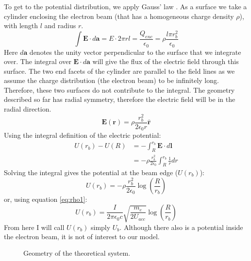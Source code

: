 To get to the potential distribution, we apply Gauss' law \cite{GriffithsEM}. As a surface we take a cylinder enclosing the electron beam (that has a homogeneous charge density $\rho$), with length $l$ and radius $r$.
\begin{equation}
\int\textbf{E}\cdot d\mathbf{a} = E\cdot2\pi r l = \frac{Q_{enc}}{\epsilon_0} = \rho \frac{l\pi r_b^2}{\epsilon_0}
\end{equation}
Here $d\mathbf{a}$ denotes the unity vector perpendicular to the surface that we integrate over. The integral over $\textbf{E}\cdot d\mathbf{a}$ will give the flux of the electric field through this surface.
The two end facets of the cylinder are parallel to the field lines as we assume the charge distribution (the electron beam) to be infinitely long. Therefore, these two surfaces do not contribute to the integral.
The geometry described so far has radial symmetry, therefore the electric field will be in the radial direction.
\begin{equation}
\mathbf{E}(\mathbf{r}) = \rho \frac{r_b^2}{2\epsilon_0r}\hat{\mathbf{r}}
\end{equation}
Using the integral definition of the electric potential:
\begin{align}
U(r_b)-U(R) &= -\int_R^{r_b} \mathbf{E}\cdot d\mathbf{l} \nonumber \\
&= - \rho \frac{r_b^2}{2\epsilon_0} \int_R^{r_b} \frac{1}{r} dr
\end{align}
Solving the integral gives the potential at the beam edge ($U(r_b)$):
\begin{equation}
\label{eq:vbeamrho}
U(r_b) = - \rho \frac{r_b^2}{2\epsilon_0} \log\left(\frac{R}{r_b}\right)
\end{equation}
or, using equation \ref{eq:rho1}:
\begin{equation}
\label{eq:vbeamI}
U(r_b)=\frac{I}{2\pi\epsilon_0 c}\sqrt{\frac{m_e}{2U_{acc}}}\log\left(\frac{R}{r_b}\right)
\end{equation}
From here I will call $U(r_b)$ simply $U_b$. Although there also is a potential inside the electron beam, it is not of interest to our model.

\begin{figure}[h]
\centering

\caption{Geometry of the theoretical system.}
\label{fig:theorygeometry}
\end{figure}

